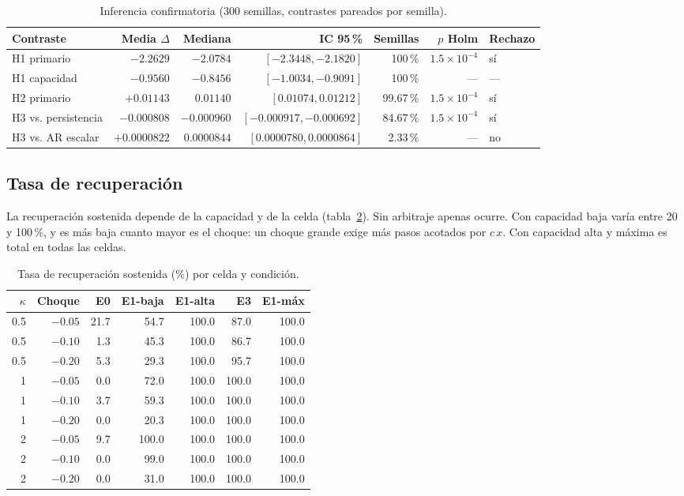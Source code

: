 \begin{table}[htbp]
\centering
\caption{Inferencia confirmatoria (300 semillas, contrastes pareados por semilla).}
\label{tab:inferencia}
\small
\begin{tabular}{@{}lrrrrrl@{}}
\toprule
Contraste & Media $\Delta$ & Mediana & IC 95\,\% & Semillas & $p$ Holm & Rechazo \\
\midrule
H1 primario & $-2.2629$ & $-2.0784$ & $[-2.3448,-2.1820]$ & 100\,\% & $1.5\times10^{-4}$ & sí \\
H1 capacidad & $-0.9560$ & $-0.8456$ & $[-1.0034,-0.9091]$ & 100\,\% & --- & --- \\
H2 primario & $+0.01143$ & $0.01140$ & $[0.01074,0.01212]$ & 99.67\,\% & $1.5\times10^{-4}$ & sí \\
H3 vs. persistencia & $-0.000808$ & $-0.000960$ & $[-0.000917,-0.000692]$ & 84.67\,\% & $1.5\times10^{-4}$ & sí \\
H3 vs. AR escalar & $+0.0000822$ & $0.0000844$ & $[0.0000780,0.0000864]$ & 2.33\,\% & --- & no \\
\bottomrule
\end{tabular}
\end{table}

\subsection{Tasa de recuperación}

La recuperación sostenida depende de la capacidad y de la celda (tabla~\ref{tab:recuperacion}). Sin arbitraje apenas ocurre. Con capacidad baja varía entre 20 y 100\,\%, y es más baja cuanto mayor es el choque: un choque grande exige más pasos acotados por $c\,x$. Con capacidad alta y máxima es total en todas las celdas.

\begin{table}[htbp]
\centering
\caption{Tasa de recuperación sostenida (\%) por celda y condición.}
\label{tab:recuperacion}
\small
\begin{tabular}{@{}rrrrrrr@{}}
\toprule
$\kappa$ & Choque & E0 & E1-baja & E1-alta & E3 & E1-máx \\
\midrule
0.5 & $-0.05$ & 21.7 & 54.7 & 100.0 & 87.0 & 100.0 \\
0.5 & $-0.10$ & 1.3 & 45.3 & 100.0 & 86.7 & 100.0 \\
0.5 & $-0.20$ & 5.3 & 29.3 & 100.0 & 95.7 & 100.0 \\
1 & $-0.05$ & 0.0 & 72.0 & 100.0 & 100.0 & 100.0 \\
1 & $-0.10$ & 3.7 & 59.3 & 100.0 & 100.0 & 100.0 \\
1 & $-0.20$ & 0.0 & 20.3 & 100.0 & 100.0 & 100.0 \\
2 & $-0.05$ & 9.7 & 100.0 & 100.0 & 100.0 & 100.0 \\
2 & $-0.10$ & 0.0 & 99.0 & 100.0 & 100.0 & 100.0 \\
2 & $-0.20$ & 0.0 & 31.0 & 100.0 & 100.0 & 100.0 \\
\bottomrule
\end{tabular}
\end{table}

